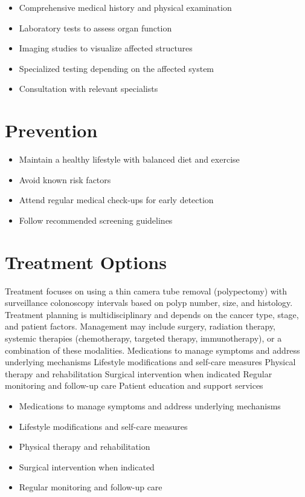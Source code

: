 \begin{itemize}[noitemsep]
  \item Comprehensive medical history and physical examination
  \item Laboratory tests to assess organ function
  \item Imaging studies to visualize affected structures
  \item Specialized testing depending on the affected system
  \item Consultation with relevant specialists
\end{itemize}
\section{Prevention}
\begin{itemize}[noitemsep]
  \item Maintain a healthy lifestyle with balanced diet and exercise
  \item Avoid known risk factors
  \item Attend regular medical check-ups for early detection
  \item Follow recommended screening guidelines
\end{itemize}
\section{Treatment Options}
Treatment focuses on using a thin camera tube removal (polypectomy) with surveillance colonoscopy intervals based on polyp number, size, and histology. Treatment planning is multidisciplinary and depends on the cancer type, stage, and patient factors. Management may include surgery, radiation therapy, systemic therapies (chemotherapy, targeted therapy, immunotherapy), or a combination of these modalities. Medications to manage symptoms and address underlying mechanisms Lifestyle modifications and self-care measures Physical therapy and rehabilitation Surgical intervention when indicated Regular monitoring and follow-up care Patient education and support services

\begin{itemize}[noitemsep]
  \item Medications to manage symptoms and address underlying mechanisms
  \item Lifestyle modifications and self-care measures
  \item Physical therapy and rehabilitation
  \item Surgical intervention when indicated
  \item Regular monitoring and follow-up care
\end{itemize}
